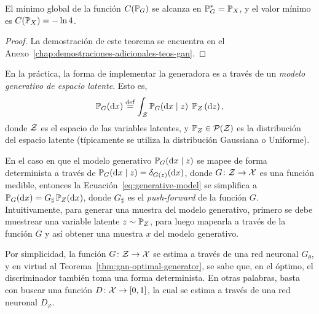 \begin{theorem}\label{thm:gan-optimal-generator}
    El mínimo global de la función $C(\Prob_G)$ se alcanza en $\Prob_G^\ast = \Prob_X$, y el valor mínimo es $C(\Prob_X) = - \ln 4$.
\end{theorem}

\begin{proof}
    La demostración de este teorema se encuentra en el Anexo~\ref{chap:demostraciones-adicionales-teos-gan}.
\end{proof}

En la práctica, la forma de implementar la generadora es a través de un \emph{modelo generativo de espacio latente}. Esto es,
\begin{equation}\label{eq:generative-model}
    \Prob_G (\dd x) \eqdef \int_\cZ \Prob_G(\dd x \mid z) \; \Prob_Z \left( \dd z\right),
\end{equation}
donde $\mathcal{Z}$ es el espacio de las variables latentes, y $\Prob_Z \in \ProbSpace[\cZ] $ es la distribución del espacio latente (típicamente se utiliza la distribución Gaussiana o Uniforme).

\begin{remark}\label{obs:modelo-generativo-push-forward}
    En el caso en que el modelo generativo $\Prob_G (\dd x \mid z)$ se mapee de forma determinista a través de $\Prob_G (\dd x \mid z) = \delta_{G(z)}(\dd x)$, donde $G\colon\mathcal{Z}\to\mathcal{X}$ es una función medible, entonces la Ecuación~\eqref{eq:generative-model} se simplifica a $\Prob_G (\dd x) = \pf{G} \Prob_Z (\dd x)$, donde ${G}_{\sharp}$ es el \emph{push-forward} de la función $G$. Intuitivamente, para generar una muestra del modelo generativo, primero se debe muestrear una variable latente $z\sim \Prob_Z$,
    para luego mapearla a través de la función $G$ y así obtener una muestra $x$ del modelo generativo.
\end{remark}

Por simplicidad, la función $G\colon \mathcal{Z} \to \mathcal{X}$ se estima a través de una red neuronal $G_\theta$, y en virtud al Teorema~\ref{thm:gan-optimal-generator}, se sabe que, en el óptimo, el discriminador también toma una forma determinista. En otras palabras, basta con buscar una función $D\colon\mathcal{X}\to [0, 1]$, la cual se estima a través de una red neuronal $D_\varphi$.


